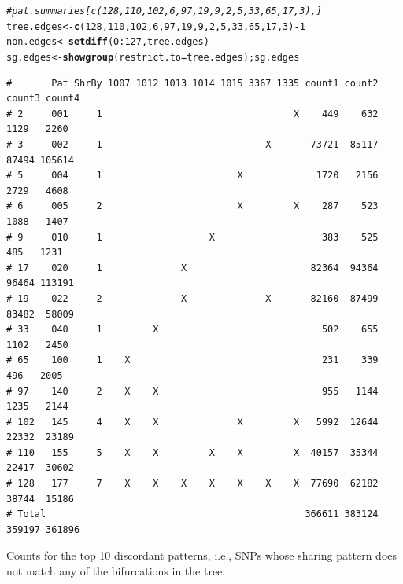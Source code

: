 \documentclass{article}\usepackage[]{graphicx}\usepackage[]{color}
\makeatletter
\newcommand{\hlnum}[1]{\textcolor[rgb]{0.686,0.059,0.569}{#1}}%
\newcommand{\hlcom}[1]{\textcolor[rgb]{0.678,0.584,0.686}{\textit{#1}}}%
\newcommand{\hlopt}[1]{\textcolor[rgb]{0,0,0}{#1}}%
\newcommand{\hlstd}[1]{\textcolor[rgb]{0.345,0.345,0.345}{#1}}%
\newcommand{\hlkwb}[1]{\textcolor[rgb]{0.69,0.353,0.396}{#1}}%
\newcommand{\hlkwc}[1]{\textcolor[rgb]{0.333,0.667,0.333}{#1}}%
\newcommand{\hlkwd}[1]{\textcolor[rgb]{0.737,0.353,0.396}{\textbf{#1}}}%
\newenvironment{kframe}{%
 \def\at@end@of@kframe{}%
 \ifinner\ifhmode%
  \def\at@end@of@kframe{\end{minipage}}%
  \begin{minipage}{\columnwidth}%
 \fi\fi%
 \def\FrameCommand##1{\hskip\@totalleftmargin \hskip-\fboxsep
 \colorbox{shadecolor}{##1}\hskip-\fboxsep
     \hskip-\linewidth \hskip-\@totalleftmargin \hskip\columnwidth}%
 \MakeFramed {\advance\hsize-\width
   \@totalleftmargin\z@ \linewidth\hsize
   \@setminipage}}%
 {\par\unskip\endMakeFramed%
 \at@end@of@kframe}
\newenvironment{knitrout}{}{} %
\makeatother
\begin{document}
\begin{knitrout}\scriptsize
{}\color{fgcolor}\begin{kframe}
\begin{alltt}
\hlcom{#pat.summaries[c(128,110,102,6,97,19,9,2,5,33,65,17,3),]}
\hlstd{tree.edges} \hlkwb{<-} \hlkwd{c}\hlstd{(}\hlnum{128}\hlstd{,}\hlnum{110}\hlstd{,}\hlnum{102}\hlstd{,}\hlnum{6}\hlstd{,}\hlnum{97}\hlstd{,}\hlnum{19}\hlstd{,}\hlnum{9}\hlstd{,}\hlnum{2}\hlstd{,}\hlnum{5}\hlstd{,}\hlnum{33}\hlstd{,}\hlnum{65}\hlstd{,}\hlnum{17}\hlstd{,}\hlnum{3}\hlstd{)}\hlopt{-}\hlnum{1}
\hlstd{non.edges} \hlkwb{<-} \hlkwd{setdiff}\hlstd{(}\hlnum{0}\hlopt{:}\hlnum{127}\hlstd{, tree.edges)}
\hlstd{sg.edges} \hlkwb{<-} \hlkwd{showgroup}\hlstd{(}\hlkwc{restrict.to}\hlstd{=tree.edges) ; sg.edges}
\end{alltt}
\begin{verbatim}
#       Pat ShrBy 1007 1012 1013 1014 1015 3367 1335 count1 count2 count3 count4
# 2     001     1                                  X    449    632   1129   2260
# 3     002     1                             X       73721  85117  87494 105614
# 5     004     1                        X             1720   2156   2729   4608
# 6     005     2                        X         X    287    523   1088   1407
# 9     010     1                   X                   383    525    485   1231
# 17    020     1              X                      82364  94364  96464 113191
# 19    022     2              X              X       82160  87499  83482  58009
# 33    040     1         X                             502    655   1102   2450
# 65    100     1    X                                  231    339    496   2005
# 97    140     2    X    X                             955   1144   1235   2144
# 102   145     4    X    X              X         X   5992  12644  22332  23189
# 110   155     5    X    X         X    X         X  40157  35344  22417  30602
# 128   177     7    X    X    X    X    X    X    X  77690  62182  38744  15186
# Total                                              366611 383124 359197 361896
\end{verbatim}
\end{kframe}
\end{knitrout}

Counts for the top 10 discordant patterns, i.e., SNPs whose sharing pattern does not match any of the bifurcations in the tree:
\end{document}
